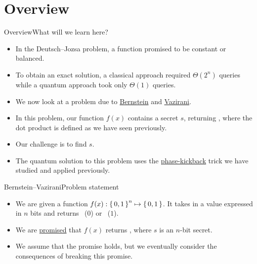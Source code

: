 
\section*{Overview}

\begin{frame}{Overview}{What will we learn here?}

\begin{itemize}[<+->]
    \item In the Deutsch--Jozsa problem, a function promised to be constant or balanced.
    \item To obtain an exact solution, a classical approach required $\Theta(2^{n})$ queries while a quantum approach took only $\Theta(1)$ queries.
    \item We now look at a problem due to \href{https://en.wikipedia.org/wiki/Ethan_Bernstein}{Bernstein} and \href{https://en.wikipedia.org/wiki/Umesh_Vazirani}{Vazirani}.
    \item In this problem, our function $f(x)$ contains a secret $s$, returning , where the dot product is defined as we have seen previously.
    \item Our challenge is to find $s$.
    \item The quantum solution to this problem uses the \href{https://qiskit.org/textbook/ch-gates/phase-kickback.html}{phase-kickback} trick we have studied and applied previously.
\end{itemize}
    
\end{frame}

\begin{frame}{Bernstein--Vazirani}{Problem statement}

\begin{itemize}[<+->]
    \item We are given a function $f(x): \left\{\,0,1\,\right\}^{n}\mapsto \left\{\,0,1\,\right\}$.  It takes in a value expressed in $n$ bits and returns \False{}~($0$) or \True~($1$).
    \item We are \href{https://en.wikipedia.org/wiki/Promise_problem}{promised} that $f(x)$ returns , where $s$ is an $n$-bit secret.
    \item We assume that the promise holds, but we eventually consider the consequences of breaking this promise.
\end{itemize}
    
\end{frame}

